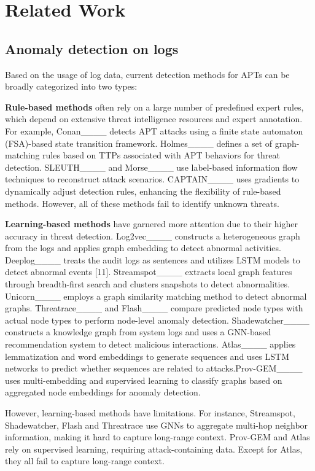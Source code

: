 \section{Related Work}
\subsection{Anomaly detection on logs}
Based on the usage of log data, current detection methods for APTs can be broadly categorized into two types: 

\noindent \textbf{Rule-based methods} often rely on a large number of predefined expert rules, which depend on extensive threat intelligence resources and expert annotation. For example, Conan____ detects APT attacks using a finite state automaton (FSA)-based state transition framework. Holmes____ defines a set of graph-matching rules based on TTPs associated with APT behaviors for threat detection. SLEUTH____ and Morse____ use label-based information flow techniques to reconstruct attack scenarios. CAPTAIN____ uses gradients to dynamically adjust detection rules, enhancing the flexibility of rule-based methods. However, all of these methods fail to identify unknown threats.

\noindent \textbf{Learning-based methods} have garnered more attention due to their higher accuracy in threat detection. Log2vec____ constructs a heterogeneous graph from the logs and applies graph embedding to detect abnormal activities. Deeplog____ treats the audit logs as sentences and utilizes LSTM models to detect abnormal events [11]. Streamspot____ extracts local graph features through breadth-first search and clusters snapshots to detect abnormalities. Unicorn____ employs a graph similarity matching method to detect abnormal graphs. Threatrace____ and Flash____ compare predicted node types with actual node types to perform node-level anomaly detection. Shadewatcher____ constructs a knowledge graph from system logs and uses a GNN-based recommendation system to detect malicious interactions. Atlas____ applies lemmatization and word embeddings to generate sequences and uses LSTM networks to predict whether sequences are related to attacks.Prov-GEM____ uses multi-embedding and supervised learning to classify graphs based on aggregated node embeddings for anomaly detection.

However, learning-based methods have limitations. For instance, Streamspot, Shadewatcher, Flash and Threatrace use GNNs to aggregate multi-hop neighbor information, making it hard to capture long-range context. Prov-GEM and Atlas rely on supervised learning, requiring attack-containing data. Except for Atlas, they all fail to capture long-range context.

